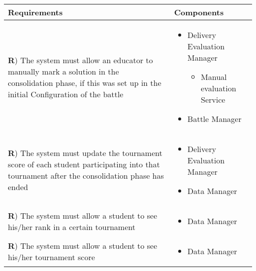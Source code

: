 \documentclass[../DD.tex]{subfiles}
\newcounter{rown}
\newcommand{\rowIndex}{\arabic{rown}\stepcounter{rown}}
\begin{document}
    \begin{table}[h!]
        \begin{center}
            \hspace*{-2cm}
            \begin{tabular}{|m{20em}|m{20em}|}
            \hline
            \textbf{Requirements} & \textbf{Components}\\
            \hline
            \textbf{R\rowIndex}) The system must allow an educator to manually mark a solution in the consolidation phase, if this was set up in the initial Configuration of the battle & \begin{itemize}
                \item Delivery Evaluation Manager
                \begin{itemize}
                    \item Manual evaluation Service
                \end{itemize} 
                \item Battle Manager
            \end{itemize}\\
            \hline
            \textbf{R\rowIndex}) The system must update the tournament score of each student participating into that tournament after the consolidation phase has ended & \begin{itemize}
                \item Delivery Evaluation Manager
                \item Data Manager
            \end{itemize}\\
            \hline
            \textbf{R\rowIndex}) The system must allow a student to see his/her rank in a certain tournament & \begin{itemize}
                \item Data Manager
            \end{itemize}\\
            \hline
            \textbf{R\rowIndex}) The system must allow a student to see his/her tournament score & \begin{itemize}
                \item Data Manager
            \end{itemize}\\
            \hline

\end{tabular}
\end{center}
\end{table}
\end{document}
